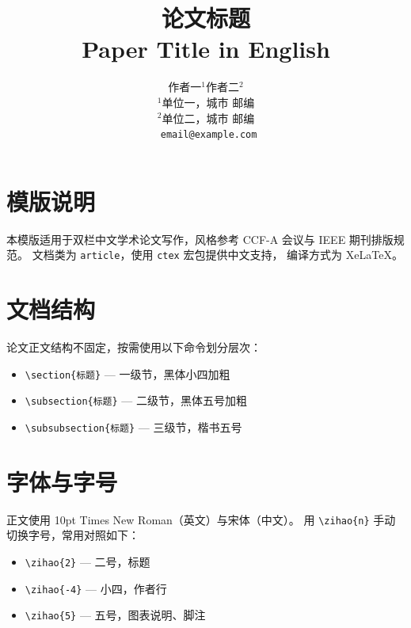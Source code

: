 \documentclass[10pt, a4paper]{article}
\title{
  \vspace{-1em}
  {\heiti\zihao{2} 论文标题}\\[4pt]
  {\zihao{-4} Paper Title in English}
}
\author{
  \zihao{-4}
  作者一$^{1}$\quad 作者二$^{2}$\\[2pt]
  \zihao{5}
  $^{1}$单位一，城市 邮编\\
  $^{2}$单位二，城市 邮编\\[2pt]
  \texttt{\zihao{5} email@example.com}
}
\date{}
\begin{document}
\maketitle
\thispagestyle{fancy}

\section{模版说明}

本模版适用于双栏中文学术论文写作，风格参考 CCF-A 会议与 IEEE 期刊排版规范。
文档类为 \texttt{article}，使用 \texttt{ctex} 宏包提供中文支持，
编译方式为 XeLaTeX。

\section{文档结构}

论文正文结构不固定，按需使用以下命令划分层次：

\begin{itemize}
  \item \verb|\section{标题}| — 一级节，黑体小四加粗
  \item \verb|\subsection{标题}| — 二级节，黑体五号加粗
  \item \verb|\subsubsection{标题}| — 三级节，楷书五号
\end{itemize}

\section{字体与字号}

正文使用 10pt Times New Roman（英文）与宋体（中文）。
用 \verb|\zihao{n}| 手动切换字号，常用对照如下：

\begin{itemize}
  \item \verb|\zihao{2}| — 二号，标题
  \item \verb|\zihao{-4}| — 小四，作者行
  \item \verb|\zihao{5}| — 五号，图表说明、脚注
\end{itemize}
\end{document}

